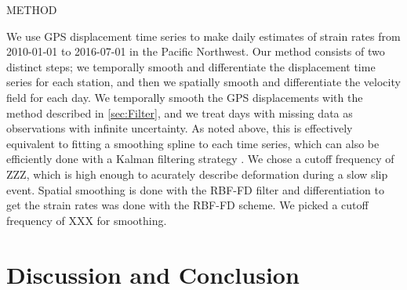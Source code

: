 \documentclass[10pt,a4paper]{article}
\begin{document}
METHOD

We use GPS displacement time series to make daily estimates of strain rates from 2010-01-01 to 2016-07-01 in the Pacific Northwest.  Our method consists of two distinct steps; we temporally smooth and differentiate the displacement time series for each station, and then we spatially smooth and differentiate the velocity field for each day.  We temporally smooth the GPS displacements with the method described in \ref{sec:Filter}, and we treat days with missing data as observations with infinite uncertainty. As noted above, this is effectively equivalent to fitting a smoothing spline to each time series, which can also be efficiently done with a Kalman filtering strategy \citep{Kohn1987}.  We chose a cutoff frequency of ZZZ, which is high enough to acurately describe deformation during a slow slip event.  Spatial smoothing is done with the RBF-FD filter and differentiation to get the strain rates was done with the RBF-FD scheme.  We picked a cutoff frequency of XXX for smoothing.

\section{Discussion and Conclusion}\label{sec:Discussion}









\end{document}
